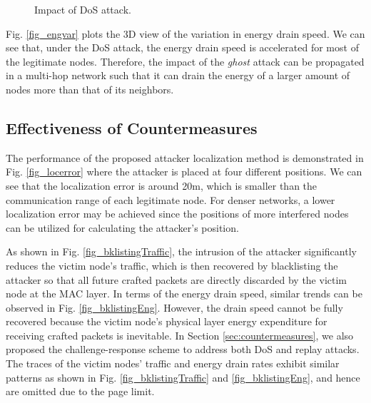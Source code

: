 \documentclass[10pt,journal,cspaper,compsoc]{IEEEtran}
\begin{document}
\begin{figure}[!ht]
\vspace{-3mm}
	\centering
    \vspace{-2mm}
	\caption{Impact of DoS attack.}	
	\label{Fig_dos}
    \vspace{-2mm}
\end{figure}

Fig. \ref{fig_engvar} plots the 3D view of the variation in energy drain speed. We can see that, under the DoS attack, the energy drain speed is accelerated for most of the legitimate nodes. Therefore, the impact of the {\em ghost} attack can be propagated in a multi-hop network such that it can drain the energy of a larger amount of nodes more than that of its neighbors.


\subsection{Effectiveness of Countermeasures}
The performance of the proposed attacker localization method is demonstrated in Fig. \ref{fig_locerror} where the attacker is placed at four different positions. We can see that the localization error is around 20m, which is smaller than the communication range of each legitimate node. For denser networks, a lower localization error may be achieved since the positions of more interfered nodes can be utilized for calculating the attacker's position.

As shown in Fig. \ref{fig_bklistingTraffic}, the intrusion of the attacker significantly reduces the victim node's traffic, which is then recovered by blacklisting the attacker so that all future crafted packets are directly discarded by the victim node at the MAC layer. In terms of the energy drain speed, similar trends can be observed in Fig. \ref{fig_bklistingEng}. However, the drain speed cannot be fully recovered because the victim node's physical layer energy expenditure for receiving crafted packets is inevitable. In Section \ref{sec:countermeasures}, we also proposed the challenge-response scheme to address both DoS and replay attacks. The traces of the victim nodes' traffic and energy drain rates exhibit similar patterns as shown in Fig. \ref{fig_bklistingTraffic} and \ref{fig_bklistingEng}, and hence are omitted due to the page limit.
\end{document}
